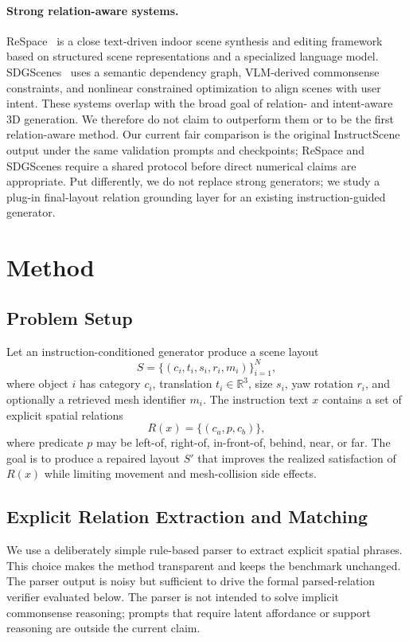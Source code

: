 \documentclass{article}
\begin{document}
\paragraph{Strong relation-aware systems.}
ReSpace~\citep{bucher2026respace} is a close text-driven indoor scene synthesis and editing framework based on structured scene representations and a specialized language model. SDGScenes~\citep{gao2026sdgscenes} uses a semantic dependency graph, VLM-derived commonsense constraints, and nonlinear constrained optimization to align scenes with user intent. These systems overlap with the broad goal of relation- and intent-aware 3D generation. We therefore do not claim to outperform them or to be the first relation-aware method. Our current fair comparison is the original InstructScene output under the same validation prompts and checkpoints; ReSpace and SDGScenes require a shared protocol before direct numerical claims are appropriate. Put differently, we do not replace strong generators; we study a plug-in final-layout relation grounding layer for an existing instruction-guided generator.

\section{Method}

\subsection{Problem Setup}

Let an instruction-conditioned generator produce a scene layout
\[
  S = \{(c_i, t_i, s_i, r_i, m_i)\}_{i=1}^{N},
\]
where object $i$ has category $c_i$, translation $t_i \in \mathbb{R}^{3}$, size $s_i$, yaw rotation $r_i$, and optionally a retrieved mesh identifier $m_i$. The instruction text $x$ contains a set of explicit spatial relations
\[
  R(x) = \{(c_a, p, c_b)\},
\]
where predicate $p$ may be left-of, right-of, in-front-of, behind, near, or far. The goal is to produce a repaired layout $S'$ that improves the realized satisfaction of $R(x)$ while limiting movement and mesh-collision side effects.

\subsection{Explicit Relation Extraction and Matching}

We use a deliberately simple rule-based parser to extract explicit spatial phrases. This choice makes the method transparent and keeps the benchmark unchanged. The parser output is noisy but sufficient to drive the formal parsed-relation verifier evaluated below. The parser is not intended to solve implicit commonsense reasoning; prompts that require latent affordance or support reasoning are outside the current claim.
\end{document}
